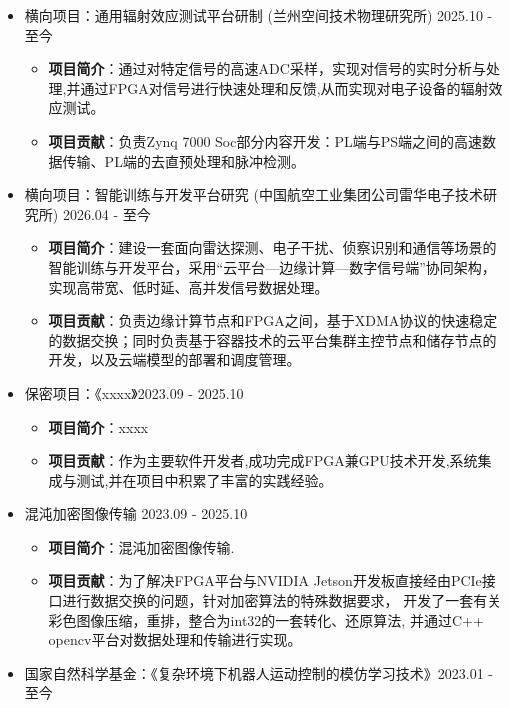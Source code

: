 \documentclass{logo-cv}
\begin{document}
\begin{itemize}
    \item 横向项目：通用辐射效应测试平台研制 (兰州空间技术物理研究所) \hfill 2025.10 - 至今
    \begin{itemize}
        \item \textbf{项目简介}：通过对特定信号的高速ADC采样，实现对信号的实时分析与处理,并通过FPGA对信号进行快速处理和反馈,从而实现对电子设备的辐射效应测试。
        \item \textbf{项目贡献}：负责Zynq 7000 Soc部分内容开发：PL端与PS端之间的高速数据传输、PL端的去直预处理和脉冲检测。
    \end{itemize}
    \item 横向项目：智能训练与开发平台研究 (中国航空工业集团公司雷华电子技术研究所) \hfill 2026.04 - 至今
    \begin{itemize}
        \item \textbf{项目简介}：建设一套面向雷达探测、电子干扰、侦察识别和通信等场景的智能训练与开发平台，采用“云平台—边缘计算—数字信号端”协同架构，实现高带宽、低时延、高并发信号数据处理。
        \item \textbf{项目贡献}：负责边缘计算节点和FPGA之间，基于XDMA协议的快速稳定的数据交换；同时负责基于容器技术的云平台集群主控节点和储存节点的开发，以及云端模型的部署和调度管理。
    \end{itemize}
    \item 保密项目：《xxxx》\hfill 2023.09 - 2025.10
    \begin{itemize}
        \item \textbf{项目简介}：xxxx
        \item \textbf{项目贡献}：作为主要软件开发者,成功完成FPGA兼GPU技术开发,系统集成与测试,并在项目中积累了丰富的实践经验。
    \end{itemize}
    \item 混沌加密图像传输 \hfill 2023.09 - 2025.10
    \begin{itemize}
        \item \textbf{项目简介}：混沌加密图像传输.
        \item \textbf{项目贡献}：为了解决FPGA平台与NVIDIA Jetson开发板直接经由PCIe接口进行数据交换的问题，针对加密算法的特殊数据要求，
        开发了一套有关彩色图像压缩，重排，整合为int32的一套转化、还原算法, 并通过C++ opencv平台对数据处理和传输进行实现。
    \end{itemize}
    \item 国家自然科学基金：《复杂环境下机器人运动控制的模仿学习技术》\hfill 2023.01 - 至今

\end{itemize}
\end{document}
